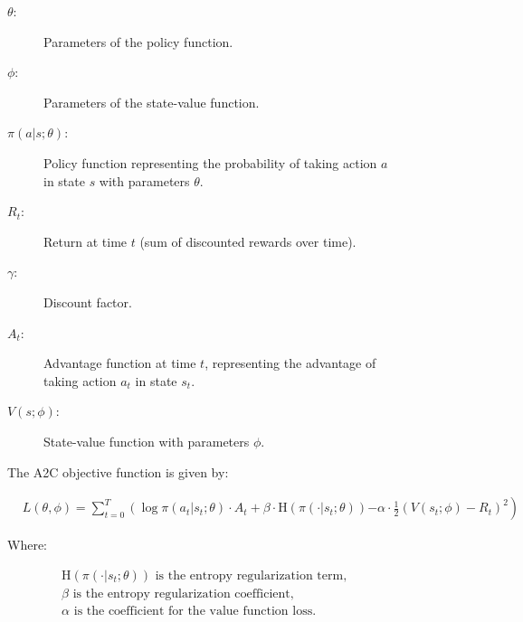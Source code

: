 \documentclass{scspaperproc}
\theoremstyle{scsthe}
\begin{document}
\begin{figure}[!t]
	\normalsize %
	\begin{description}
	  \item[$\theta$:] Parameters of the policy function.
	  \item[$\phi$:] Parameters of the state-value function.
	  \item[$\pi(a|s;\theta)$:] Policy function representing the probability of taking action $a$ in state $s$ with parameters $\theta$.
	  \item[$R_t$:] Return at time $t$ (sum of discounted rewards over time).
	  \item[$\gamma$:] Discount factor.
	  \item[$A_t$:] Advantage function at time $t$, representing the advantage of taking action $a_t$ in state $s_t$.
	  \item[$V(s;\phi)$:] State-value function with parameters $\phi$.
	\end{description}
	
  
  
	The A2C objective function is given by:
  
  
	\begin{align}
	&L(\theta, \phi) = \sum_{t=0}^{T} \left( \log \pi(a_t|s_t;\theta) \cdot A_t + \beta \cdot \text{H}(\pi(\cdot|s_t;\theta)) \right. \left. - \alpha \cdot \frac{1}{2} (V(s_t;\phi) - R_t)^2 \right)
  \end{align}
  
  
	Where:
  
	\begin{align}
	&\text{H}(\pi(\cdot|s_t;\theta)) \text{ is the entropy regularization term,} \\
	&\beta \text{ is the entropy regularization coefficient,} \\
	&\alpha \text{ is the coefficient for the value function loss.}
	\end{align}
	\end{figure}
  
  
\end{document}
